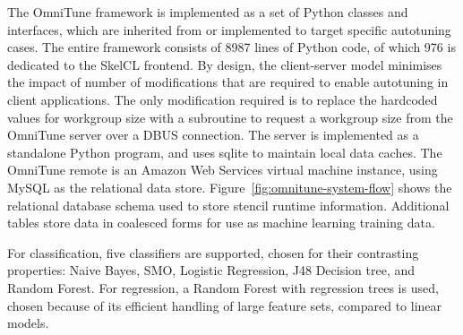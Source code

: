 The OmniTune framework is implemented as a set of Python classes and
interfaces, which are inherited from or implemented to target specific
autotuning cases. The entire framework consists of 8987 lines of
Python code, of which 976 is dedicated to the SkelCL frontend. By
design, the client-server model minimises the impact of number of
modifications that are required to enable autotuning in client
applications. The only modification required is to replace the
hardcoded values for workgroup size with a subroutine to request a
workgroup size from the OmniTune server over a DBUS connection. The
server is implemented as a standalone Python program, and uses sqlite
to maintain local data caches. The OmniTune remote is an Amazon Web
Services virtual machine instance, using MySQL as the relational data
store. Figure~\ref{fig:omnitune-system-flow} shows the relational
database schema used to store stencil runtime information. Additional
tables store data in coalesced forms for use as machine learning
training data.

For classification, five classifiers are supported, chosen for their
contrasting properties: Naive Bayes, SMO, Logistic Regression, J48
Decision tree, and Random Forest. For regression, a Random Forest with
regression trees is used, chosen because of its efficient handling of
large feature sets, compared to linear models.

